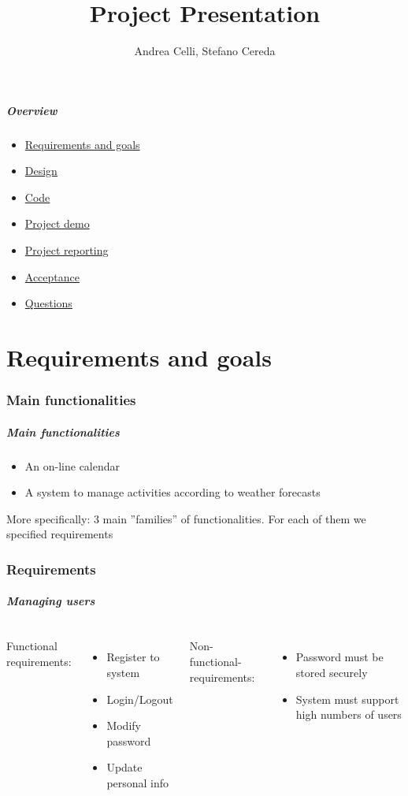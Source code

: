 \documentclass[professionalfont]{beamer}
\title{Project Presentation}
\author{Andrea Celli, Stefano Cereda}
\institute[PoliMi]{Politecnico di Milano}
\begin{document}
\begin{frame}
\maketitle
\end{frame}

\begin{frame}
\frametitle{Overview}
\begin{itemize}
\item \hyperref[part:RASD]{Requirements and goals}
\item \hyperref[part:Design]{Design}
\item \hyperref[part:Code]{Code}
\item \hyperref[part:demo]{Project demo}
\item \hyperref[part:Reporting]{Project reporting}
\item \hyperref[part:Acceptance]{Acceptance}
\item \hyperref[part:questions]{Questions}
\end{itemize}
\end{frame}

\part{Requirements and goals}
\label{part:RASD}
\section{Main functionalities}
\begin{frame}
\frametitle{Main functionalities}
\begin{itemize}
\item An on-line calendar
\item A system to manage activities according to weather forecasts
\end{itemize}
More specifically: \alert{3 main ''families'' of functionalities}. For each of them we specified requirements
\end{frame}

\section{Requirements}
\begin{frame}
\frametitle{Managing users}
\begin{columns}[c]
Functional requirements:
\begin{itemize}
\item Register to system
\item Login/Logout
\item Modify password
\item Update personal info
\end{itemize}
Non-functional-requirements:
\begin{itemize}
\item Password must be stored securely
\item System must support high numbers of users
\end{itemize}
\end{columns}
\end{frame}
\end{document}
